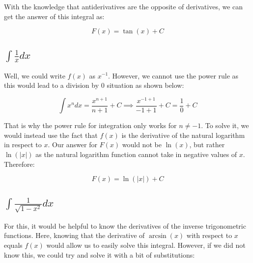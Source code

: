 \documentclass[12pt]{article}
\begin{document}
With the knowledge that antiderivatives are the opposite of derivatives, we can get the answer of this integral as:

$$
    F(x) = \tan(x) + C
$$

\subsection {$\int \frac{1}{x} dx$}

Well, we could write $f(x)$ as $x^{-1}$. However, we cannot use the power rule as this would lead to a division by $0$ situation as shown below:

$$
    \int x^{n} dx = \frac{x^{n+1}}{n+1} + C \implies
    \frac{x^{-1 + 1}}{-1 + 1} + C = \frac{1}{0} + C
$$

That is why the power rule for integration only works for $n \neq -1$. To solve it, we would instead use the fact that $f(x)$ is the derivative of the natural logarithm in respect to $x$. Our answer for $F(x)$ would not be $\ln(x)$, but rather $\ln(|x|)$ as the natural logarithm function cannot take in negative values of $x$. Therefore:

$$
    F(x) = \ln(|x|) + C
$$

\subsection{$\int \frac{1}{\sqrt{1-x^2}} dx$}

For this, it would be helpful to know the derivatives of the inverse trigonometric functions. Here, knowing that the derivative of $\arcsin(x)$ with respect to $x$ equals $f(x)$ would allow us to easily solve this integral. However, if we did not know this, we could try and solve it with a bit of substitutions:
\end{document}
